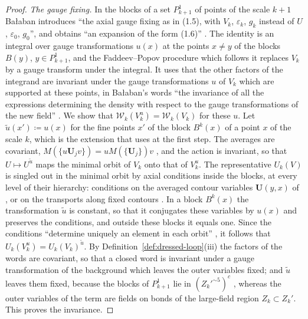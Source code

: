 \documentclass[11pt]{preprint}
\numberwithin{equation}{section}
\theoremstyle{definition}
\theoremstyle{remark}
\theoremstyle{plain}
\begin{document}
\begin{proof}
\emph{The gauge fixing.} In the blocks of a set $P^1_{k+1}$ of points of the scale $k + 1$ Ba{\l}aban introduces ``the axial gauge fixing as in (1.5), with $V_k$, $\varepsilon_k$, $g_k$ instead of $U$, $\varepsilon_0$, $g_0$'', and obtains ``an expansion of the form (1.6)'' \cite[p.~265]{BalabanCRE}. The identity \cite[(1.5), p.~247]{BalabanCRE} is an integral over gauge transformations $u(x)$ at the points $x \neq y$ of the blocks $B(y)$, $y \in P^1_{k+1}$, and the Faddeev--Popov procedure which follows it replaces $V_k$ by a gauge transform under the integral. It uses that the other factors of the integrand are invariant under the gauge transformations $u$ of $V_k$ which are supported at these points, in Ba{\l}aban's words ``the invariance of all the expressions determining the density with respect to the gauge transformations of the new field'' \cite[p.~250]{BalabanCRE}. We show that $\mathcal W_k(V_k^u) = \mathcal W_k(V_k)$ for these $u$. Let $\tilde u(x') \coloneqq u(x)$ for the fine points $x'$ of the block $B^k(x)$ of a point $x$ of the scale $k$, which is the extension that \cite[p.~250]{BalabanCRE} uses at the first step. The averages are covariant, $M(\{ u\mathbf U_jv \}) = uM(\{ \mathbf U_j \})v$ \cite[(0.6), p.~253]{BalabanRG1}, and the action is invariant, so that $U \mapsto U^{\tilde u}$ maps the minimal orbit of $V_k$ onto that of $V_k^u$. The representative $U_k(V)$ is singled out in the minimal orbit by axial conditions inside the blocks, at every level of their hierarchy: conditions on the averaged contour variables $\mathbf U(y, x)$ of \cite[(0.11), p.~253]{BalabanRG1}, or on the transports along fixed contours \cite[(1.15), p.~78]{BalabanREG}. In a block $B^k(x)$ the transformation $\tilde u$ is constant, so that it conjugates these variables by $u(x)$ and preserves the conditions, and outside these blocks it equals one. Since the conditions ``determine uniquely an element in each orbit'' \cite[p.~78]{BalabanREG}, it follows that $U_k(V_k^u) = U_k(V_k)^{\tilde u}$. By Definition~\ref{def:dressed-loop}(iii) the factors of the words are covariant, so that a closed word is invariant under a gauge transformation of the background which leaves the outer variables fixed; and $\tilde u$ leaves them fixed, because the blocks of $P^1_{k+1}$ lie in $(Z_k'^{\sim5})^c$ \cite[p.~265]{BalabanCRE}, whereas the outer variables of the term are fields on bonds of the large-field region $Z_k \subset Z_k'$. This proves the invariance.


\end{proof}
\end{document}
